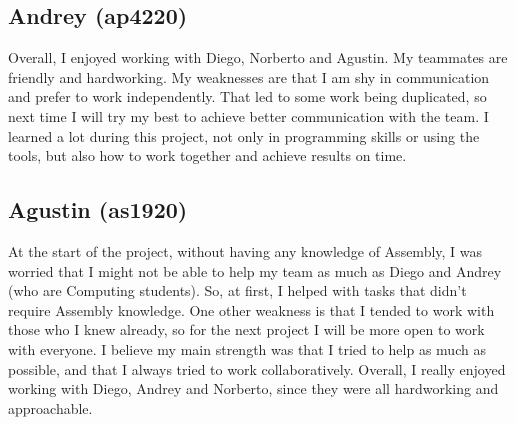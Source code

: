 \documentclass[11pt]{article}
\begin{document}
\subsection{Andrey (ap4220)}
Overall, I enjoyed working with Diego, Norberto and Agustin. My teammates are friendly and hardworking. My weaknesses are that I am shy in communication and prefer to work independently. That led to some work being duplicated, so next time I will try my best to achieve better communication with the team. I learned a lot during this project, not only in programming skills or using the tools, but also how to work together and achieve results on time.

\subsection{Agustin (as1920)}
At the start of the project, without having any knowledge of Assembly, I was worried that I might not be able to help my team as much as Diego and Andrey (who are Computing students). So, at first, I helped with tasks that didn't require Assembly knowledge. One other weakness is that I tended to work with those who I knew already, so for the next project I will be more open to work with everyone. I believe my main strength was that I tried to help as much as possible, and that I always tried to work collaboratively. Overall, I really enjoyed working with Diego, Andrey and Norberto, since they were all hardworking and approachable.
\end{document}

